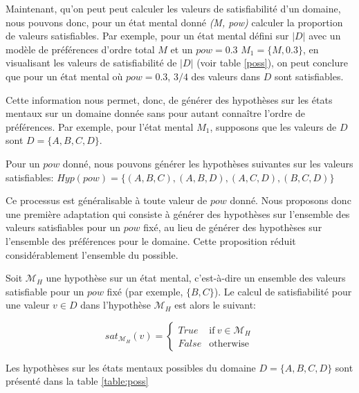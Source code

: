\documentclass{llncs}
\begin{document}
	Maintenant, qu'on peut peut calculer les valeurs de satisfiabilité d'un domaine, nous pouvons donc, pour un état mental donné \emph{(M, pow)} calculer la proportion de valeurs satisfiables. 
	Par exemple, pour un état mental défini sur $|D|$ avec un modèle de préférences d'ordre total $M$ et un $pow =0.3$ $M_1 = \{M, 0.3\}$, en visualisant les valeurs de satisfiabilité de $|D|$ (voir table \ref{poss}), on peut conclure que pour un état mental où $pow =0.3$, $3/4$ des valeurs dans $D$ sont satisfiables. 
	
	Cette information nous permet, donc, de générer des hypothèses sur les états mentaux sur un domaine donnée sans pour autant connaître l'ordre de préférences.
	Par exemple, pour l'état mental $M_1$,  supposons que les valeurs de $D$ sont $D =\{A, B, C, D\}$.
	
	Pour un $pow$ donné, nous pouvons générer les hypothèses suivantes sur les valeurs satisfiables: 
	$Hyp(pow) = \{(A,B,C) , (A,B,D), (A,C,D), (B,C,D) \}$
	
	Ce processus est généralisable à toute valeur de $pow$ donné. Nous proposons donc une première adaptation qui consiste à générer des hypothèses sur l'ensemble des valeurs satisfiables pour un $pow$ fixé, au lieu de générer des hypothèses sur l'ensemble des préférences pour le domaine. Cette proposition réduit considérablement l'ensemble du possible.
	
	Soit $\mathcal{M}_H$ une hypothèse sur un état mental, c'est-à-dire un ensemble des valeurs satisfiable pour un $pow$ fixé (par exemple, $\{B,C\}$). Le calcul de satisfiabilité pour une valeur $v\in D$ dans l'hypothèse $\mathcal{M}_H$ est alors le suivant: 
	
		\begin{equation}
		sat_{\mathcal{M}_H}(v)= \left\{\begin{array}{ll}
		True	 & \mathrm{if\ }  v \in \mathcal{M}_H\\
		False & \mathrm{otherwise}
		\end{array}\right.
		\end{equation}
		
	Les hypothèses sur les états mentaux possibles du domaine $D =\{A, B, C, D\}$ sont présenté dans la table \ref{table:poss} 
	
\end{document}
